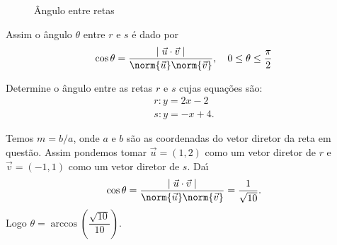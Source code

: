 \begin{figure}[!h]
  \centering
  \caption{Ângulo entre retas}
\end{figure}

Assim o \^angulo $\theta$ entre $r$ e $s$ \'e dado por
\[
  \cos\theta = \dfrac{\mid\vec{u}\cdot\vec{v}\mid}{\norm{\vec{u}}\norm{\vec{v}}},\quad 0 \le \theta \le \dfrac{\pi}{2}
\]

\begin{exemplos}
  Determine o \^angulo entre as retas $r$ e $s$ cujas equa\c{c}\~oes s\~ao:
  \begin{align*}
    r: y = 2x -2\\
    s: y = -x + 4.
  \end{align*}
  \begin{solucao}
    Temos $m = b/a$, onde $a$ e $b$ s\~ao as coordenadas do vetor diretor da reta em quest\~ao. Assim pondemos tomar $\vec{u} = (1,2)$ como um vetor diretor de $r$ e $\vec{v} = (-1,1)$ como um vetor diretor de $s$. Da{\'\i}
    \[
      \cos\theta = \dfrac{\mid\vec{u}\cdot\vec{v}\mid}{\norm{\vec{u}}\norm{\vec{v}}} = \dfrac{1}{\sqrt{10}}.
    \]
    Logo $\theta = \arccos\left(\dfrac{\sqrt{10}}{10}\right)$.
  \end{solucao}
\end{exemplos}


